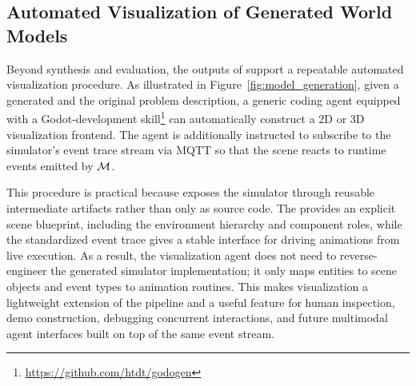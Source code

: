 

\subsection{Automated Visualization of Generated World Models}

Beyond synthesis and evaluation, the outputs of \methodname{} support a repeatable automated visualization procedure. As illustrated in Figure~\ref{fig:model_generation}, given a generated \plantree{} and the original problem description, a generic coding agent equipped with a Godot-development skill\footnote{\url{https://github.com/htdt/godogen}} can automatically construct a 2D or 3D visualization frontend. The agent is additionally instructed to subscribe to the simulator's event trace stream via MQTT so that the scene reacts to runtime events emitted by $\mathcal{M}$.

This procedure is practical because \methodname{} exposes the simulator through reusable intermediate artifacts rather than only as source code. The \plantree{} provides an explicit scene blueprint, including the environment hierarchy and component roles, while the standardized event trace gives a stable interface for driving animations from live execution. As a result, the visualization agent does not need to reverse-engineer the generated simulator implementation; it only maps \plantree{} entities to scene objects and event types to animation routines. This makes visualization a lightweight extension of the pipeline and a useful feature for human inspection, demo construction, debugging concurrent interactions, and future multimodal agent interfaces built on top of the same event stream.

